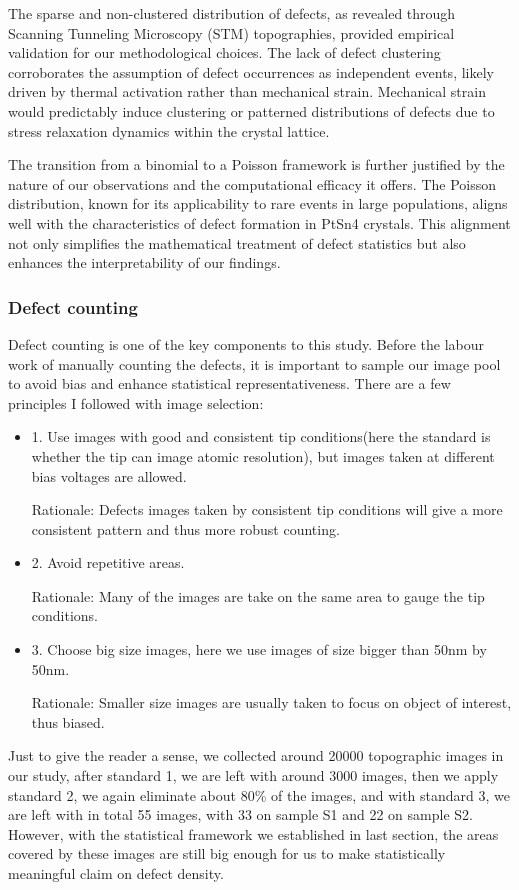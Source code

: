 \par The sparse and non-clustered distribution of defects, as revealed through Scanning Tunneling Microscopy (STM) topographies, provided empirical validation for our methodological choices. The lack of defect clustering corroborates the assumption of defect occurrences as independent events, likely driven by thermal activation rather than mechanical strain. Mechanical strain would predictably induce clustering or patterned distributions of defects due to stress relaxation dynamics within the crystal lattice.
\par The transition from a binomial to a Poisson framework is further justified by the nature of our observations and the computational efficacy it offers. The Poisson distribution, known for its applicability to rare events in large populations, aligns well with the characteristics of defect formation in PtSn4 crystals. This alignment not only simplifies the mathematical treatment of defect statistics but also enhances the interpretability of our findings.

\subsubsection{Defect counting}
Defect counting is one of the key components to this study. Before the labour work of manually counting the defects, it is important to sample our image pool to avoid bias and enhance statistical representativeness. There are a few principles I followed with image selection: 
\begin{itemize}
	\item 1. Use images with good and consistent tip conditions(here the standard is whether the tip can image atomic resolution), but images taken at different bias voltages are allowed. 
	\par Rationale: Defects images taken by consistent tip conditions will give a more consistent pattern and thus more robust counting.	
	\item 2. Avoid repetitive areas. 
	\par Rationale: Many of the images are take on the same area to gauge the tip conditions.
	\item 3. Choose big size images, here we use images of size bigger than 50nm by 50nm.
	\par Rationale: Smaller size images are usually taken to focus on object of interest, thus biased.  
\end{itemize}  
Just to give the reader a sense, we collected around 20000 topographic images in our study, after standard 1, we are left with around 3000 images, then we apply standard 2, we again eliminate about 80\% of the images, and with standard 3, we are left with in total 55 images, with 33 on sample S1 and 22 on sample S2. However, with the statistical framework we established in last section, the areas covered by these images are still big enough for us to make statistically meaningful claim on defect density.

